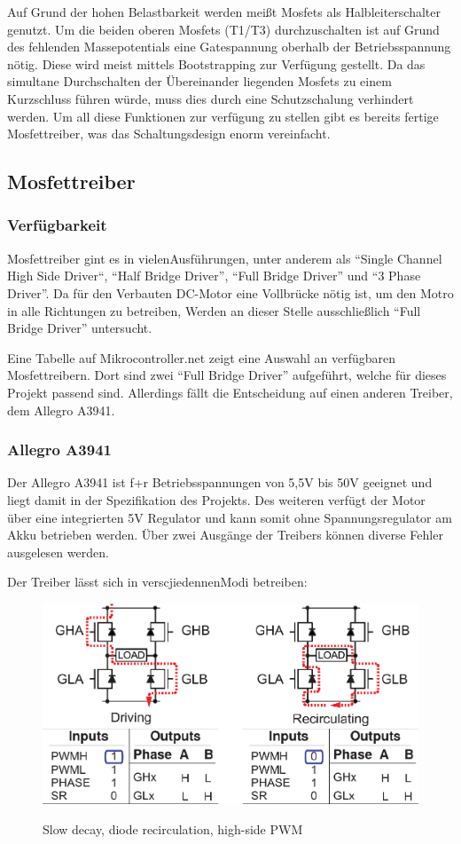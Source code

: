 Auf Grund der hohen Belastbarkeit werden meißt Mosfets als Halbleiterschalter genutzt. Um die beiden oberen Mosfets (T1/T3) durchzuschalten
ist auf Grund des fehlenden Massepotentials eine Gatespannung oberhalb der Betriebsspannung nötig. Diese wird meist mittels Bootstrapping zur
Verfügung gestellt. Da das simultane Durchschalten der Übereinander liegenden Mosfets zu einem Kurzschluss führen würde, muss dies durch
eine Schutzschalung verhindert werden. Um all diese Funktionen zur verfügung zu stellen gibt es bereits fertige Mosfettreiber,
was das Schaltungsdesign enorm vereinfacht.

\subsection{Mosfettreiber}
\subsubsection{Verfügbarkeit}

Mosfettreiber gint es in vielenAusführungen, unter anderem als ``Single Channel High Side Driver``, ``Half Bridge Driver'', ``Full Bridge Driver''
und ``3 Phase Driver''. Da für den Verbauten DC-Motor eine Vollbrücke nötig ist, um den Motro in alle Richtungen zu betreiben, Werden an dieser Stelle
ausschließlich ``Full Bridge Driver'' untersucht.

Eine Tabelle auf Mikrocontroller.net\cite{FET_D_TABLE} zeigt eine Auswahl an verfügbaren Mosfettreibern. Dort sind zwei
``Full Bridge Driver'' aufgeführt, welche für dieses Projekt passend sind. Allerdings fällt die Entscheidung auf einen anderen Treiber,
dem Allegro A3941.
\subsubsection{Allegro A3941}
Der Allegro A3941 ist f+r Betriebsspannungen von 5,5V bis 50V geeignet und liegt damit in der Spezifikation des Projekts.
Des weiteren verfügt der Motor über eine integrierten 5V Regulator und kann somit ohne Spannungsregulator am Akku betrieben werden.
Über zwei Ausgänge der Treibers können diverse Fehler ausgelesen werden.


Der Treiber lässt sich in verscjiedennenModi betreiben:

\begin{figure}[H]
\centering
\includegraphics[width=.8\textwidth]{3941_1.png}\\
\caption{Slow decay, diode recirculation, high-side PWM}%
\label{fig:3941_1}
\end{figure}


